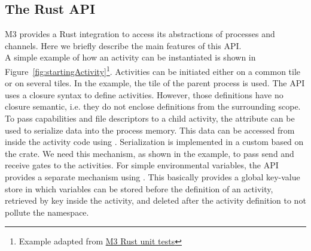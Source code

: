\subsection{The Rust API}
M3 provides a Rust integration to access its abstractions of processes and channels. Here we briefly describe the main features of this API. \\

A simple example of how an activity can be instantiated is shown in Figure~\ref{fig:startingActivity}\footnote{Example adapted from \href{https://github.com/Barkhausen-Institut/M3/blob/master/src/apps/rustunittests/src/tactivity.rs}{M3 Rust unit tests}}. Activities can be initiated either on a common tile or on several tiles. In the example, the tile of the parent process is used. The API uses a closure syntax to define activities. However, those definitions have no closure semantic, i.e. they do not enclose definitions from the surrounding scope.\\

To pass capabilities and file descriptors to a child activity, the attribute  can be used to serialize data into the process memory. This data can be accessed from inside the activity code using . Serialization is implemented in a custom  based on the  crate. We need this mechanism, as shown in the example, to pass send and receive gates to the activities. For simple environmental variables, the API provides a separate mechanism using . This basically provides a global key-value store in which variables can be stored before the definition of an activity, retrieved by key inside the activity, and deleted after the activity definition to not pollute the namespace.


